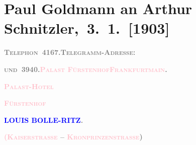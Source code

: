 

\renewcommand{\erwaehntePersonen}{Personen:  ?? [Partner von Theodore Rottenberg, Ende 1902/Anfang 1903], Louis Bolle-Ritz, Heinrich Heine, Elise Krinitz, Theodore Rottenberg, Olga Schnitzler, Heinrich Schnitzler}
\renewcommand{\erwaehnteOrte}{Orte: Frankfurt am Main, Fürstenhof, Kaiserstraße, Monte Carlo, Münchener Straße, Wien}
\renewcommand{\erwaehnteWerke}{Werke: Gedichte an die Mouche}
\section[ Paul Goldmann an Arthur Schnitzler, 3. 1. {[}1903{]}]{Paul Goldmann an Arthur Schnitzler, 3. 1. {[}1903{]}}
\nopagebreak{}
\rehead{ }\normalsize\beginnumbering{}
\toendnotes[C]{\smallbreak\pagebreak[2]}
\toendnotes[C]{\smallbreak}
\pstart
           \noindent{}{\pb}\textcolor{gray}{\textbf{\textsc{Telephon \textbf{4167.}}}}\hfill \textcolor{gray}{\textbf{\textsc{Telegramm-Adresse:}}}\pend
           
\pstart
           \textcolor{gray}{\textbf{\textsc{und \textbf{3940.}}}}\hfill \textcolor{gray}{\textbf{\textbf{\textsc{\textcolor{pink}{Palast Fürstenhof}{}\ledrightnote{\textcolor{pink}{Fürstenhof}}{ }\textcolor{pink}{Frankfurtmain}{}\ledrightnote{\textcolor{pink}{Frankfurt am Main}}.}}}}\pend
           
\pstart
           \centering{}\textcolor{gray}{\textbf{\textsc{\textbf{\textcolor{pink}{Palast-Hotel}{}\ledrightnote{\textcolor{pink}{Fürstenhof}}}}}}\pend
           
\pstart
           \noindent{}\centering{}\textcolor{gray}{\textbf{\textsc{\textcolor{pink}{Fürstenhof}{}\ledrightnote{\textcolor{pink}{Fürstenhof}}}}}\pend
           
\pstart
           \noindent{}\centering{}\textcolor{gray}{\textbf{\textcolor{blue}{LOUIS BOLLE-RITZ}{}\ledrightnote{\textcolor{blue}{Louis Bolle-Ritz}}.}}\pend
           
\pstart
           \noindent{}\centering{}\textcolor{gray}{\textbf{\textsc{\textcolor{pink}{(Kaiserstrasse}{}\ledrightnote{\textcolor{pink}{Kaiserstraße}} – \textcolor{pink}{Kronprinzenstrasse}{}\ledrightnote{\textcolor{pink}{Münchener Straße}})}}}\pend
           

